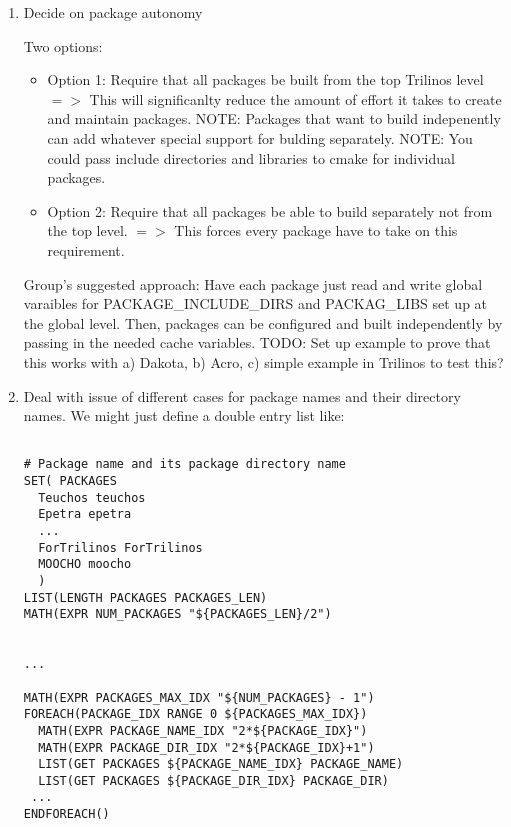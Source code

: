 \documentclass[pdf,ps2pdf,11pt]{SANDreport}
\begin{document}
\begin{enumerate}

{}\item Decide on package autonomy

Two options:

  \begin{itemize}

  {}\item Option 1: Require that all packages be built from the top
  Trilinos level $=>$ This will significanlty reduce the amount of
  effort it takes to create and maintain packages.  NOTE: Packages
  that want to build indepenently can add whatever special support for
  bulding separately.  NOTE: You could pass include directories and
  libraries to cmake for individual packages.

  {}\item Option 2: Require that all packages be able to build
  separately not from the top level. $=>$ This forces every package
  have to take on this requirement.

  \end{itemize}

Group's suggested approach: Have each package just read and write
global varaibles for PACKAGE\_INCLUDE\_DIRS and PACKAG\_LIBS set up at
the global level.  Then, packages can be configured and built
independently by passing in the needed cache variables.  TODO: Set up
example to prove that this works with a) Dakota, b) Acro, c) simple
example in Trilinos to test this?

{}\item Deal with issue of different cases for package names and their
directory names.  We might just define a double entry list like:

\begin{verbatim}

# Package name and its package directory name
SET( PACKAGES
  Teuchos teuchos
  Epetra epetra
  ...
  ForTrilinos ForTrilinos
  MOOCHO moocho
  )
LIST(LENGTH PACKAGES PACKAGES_LEN)
MATH(EXPR NUM_PACKAGES "${PACKAGES_LEN}/2")


...

MATH(EXPR PACKAGES_MAX_IDX "${NUM_PACKAGES} - 1")
FOREACH(PACKAGE_IDX RANGE 0 ${PACKAGES_MAX_IDX})
  MATH(EXPR PACKAGE_NAME_IDX "2*${PACKAGE_IDX}")
  MATH(EXPR PACKAGE_DIR_IDX "2*${PACKAGE_IDX}+1")
  LIST(GET PACKAGES ${PACKAGE_NAME_IDX} PACKAGE_NAME)
  LIST(GET PACKAGES ${PACKAGE_DIR_IDX} PACKAGE_DIR)
 ...
ENDFOREACH()

\end{verbatim}


\end{enumerate}
\end{document}
